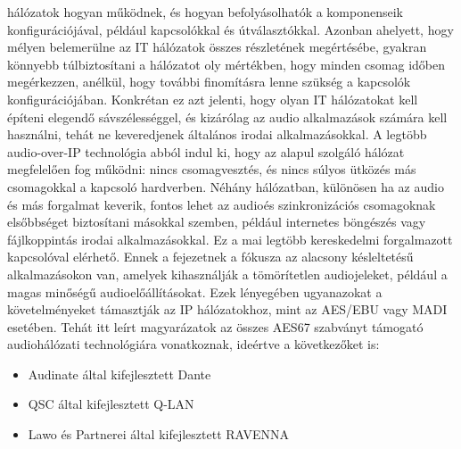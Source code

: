hálózatok hogyan működnek, és hogyan befolyásolhatók a komponenseik
konfigurációjával, például kapcsolókkal és útválasztókkal. Azonban ahelyett,
hogy mélyen belemerülne az IT hálózatok összes részletének megértésébe, gyakran
könnyebb túlbiztosítani a hálózatot oly mértékben, hogy minden csomag időben
megérkezzen, anélkül, hogy további finomításra lenne szükség a kapcsolók
konfigurációjában. Konkrétan ez azt jelenti, hogy olyan IT hálózatokat kell
építeni elegendő sávszélességgel, és kizárólag az audio alkalmazások számára
kell használni, tehát ne keveredjenek általános irodai alkalmazásokkal. A
legtöbb audio-over-IP technológia abból indul ki, hogy az alapul szolgáló
hálózat megfelelően fog működni: nincs csomagvesztés, és nincs súlyos ütközés
más csomagokkal a kapcsoló hardverben. Néhány hálózatban, különösen ha az audio
és más forgalmat keverik, fontos lehet az audioés szinkronizációs csomagoknak
elsőbbséget biztosítani másokkal szemben, például internetes böngészés vagy
fájlkoppintás irodai alkalmazásokkal. Ez a mai legtöbb kereskedelmi forgalmazott
kapcsolóval elérhető. Ennek a fejezetnek a fókusza az alacsony késleltetésű
alkalmazásokon van, amelyek kihasználják a tömörítetlen audiojeleket, például a
magas minőségű audioelőállításokat. Ezek lényegében ugyanazokat a
követelményeket támasztják az IP hálózatokhoz, mint az AES/EBU vagy MADI
esetében. Tehát itt leírt magyarázatok az összes AES67 szabványt támogató
audiohálózati technológiára vonatkoznak, ideértve a következőket is:

\begin{itemize}
	\item Audinate által kifejlesztett Dante
\end{itemize}


\begin{itemize}
	\item QSC által kifejlesztett Q-LAN
\end{itemize}


\begin{itemize}
	\item Lawo és Partnerei által kifejlesztett RAVENNA
\end{itemize}


